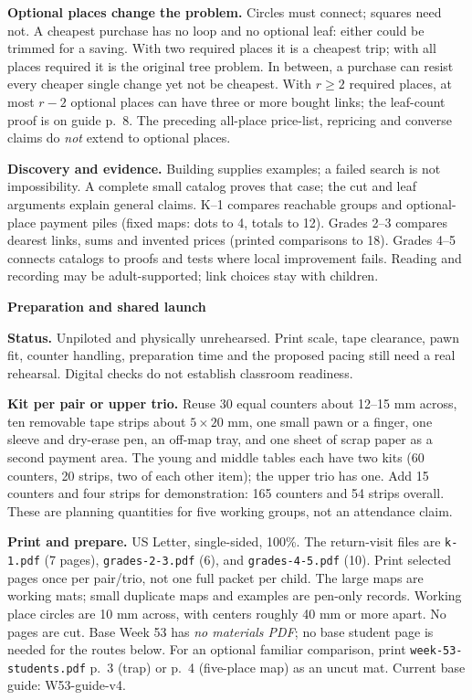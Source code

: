 \documentclass[11pt]{article}
\newcommand{\head}[1]{\par{\large\bfseries #1}\par}
\begin{document}
\textbf{Optional places change the problem.} Circles must connect; squares need not. A cheapest purchase has no loop and no optional leaf: either could be trimmed for a saving. With two required places it is a cheapest trip; with all places required it is the original tree problem. In between, a purchase can resist every cheaper single change yet not be cheapest. With $r\ge2$ required places, at most $r-2$ optional places can have three or more bought links; the leaf-count proof is on guide p.~8. The preceding all-place price-list, repricing and converse claims do \emph{not} extend to optional places.

\textbf{Discovery and evidence.} Building supplies examples; a failed search is not impossibility. A complete small catalog proves that case; the cut and leaf arguments explain general claims. K--1 compares reachable groups and optional-place payment piles (fixed maps: dots to 4, totals to 12). Grades 2--3 compares dearest links, sums and invented prices (printed comparisons to 18). Grades 4--5 connects catalogs to proofs and tests where local improvement fails. Reading and recording may be adult-supported; link choices stay with children.
\newpage
\head{Preparation and shared launch}
\textbf{Status.} Unpiloted and physically unrehearsed. Print scale, tape clearance, pawn fit, counter handling, preparation time and the proposed pacing still need a real rehearsal. Digital checks do not establish classroom readiness.

\textbf{Kit per pair or upper trio.} Reuse 30 equal counters about 12--15 mm across, ten removable tape strips about $5\times20$ mm, one small pawn or a finger, one sleeve and dry-erase pen, an off-map tray, and one sheet of scrap paper as a second payment area. The young and middle tables each have two kits (60 counters, 20 strips, two of each other item); the upper trio has one. Add 15 counters and four strips for demonstration: 165 counters and 54 strips overall. These are planning quantities for five working groups, not an attendance claim.

\textbf{Print and prepare.} US Letter, single-sided, 100\%. The return-visit files are \texttt{k-1.pdf} (7 pages), \texttt{grades-2-3.pdf} (6), and \texttt{grades-4-5.pdf} (10). Print selected pages once per pair/trio, not one full packet per child. The large maps are working mats; small duplicate maps and examples are pen-only records. Working place circles are 10 mm across, with centers roughly 40 mm or more apart. No pages are cut. Base Week 53 has \emph{no materials PDF}; no base student page is needed for the routes below. For an optional familiar comparison, print \texttt{week-53-students.pdf} p.~3 (trap) or p.~4 (five-place map) as an uncut mat. Current base guide: W53-guide-v4.
\end{document}
